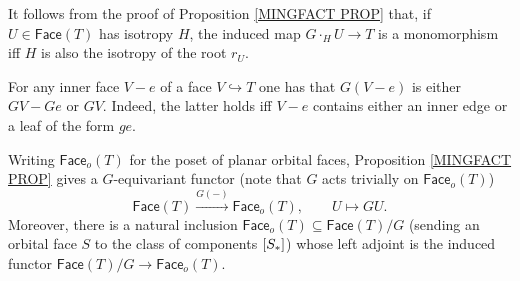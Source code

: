 \documentclass[a4paper,10pt
]{article}%
\begin{document}
\begin{remark}
	It follows from the proof of 
	Proposition \ref{MINGFACT PROP}
	that, if $U \in \mathsf{Face}(T)$ has isotropy $H$,
	the induced map 
	$G \cdot_H U \to T$ is a monomorphism iff
	$H$ is also the isotropy of the root $r_U$.
\end{remark}


\begin{remark}\label{GINNER REM}
	For any inner face $V-e$ 
	of a face $V \hookrightarrow T$ one has 
	that $G(V-e)$ is either $GV - Ge$ or $GV$.
	Indeed, the latter holds iff $V-e$ contains either an inner edge or a leaf of the form $ge$.
\end{remark}


\begin{remark}
Writing $\mathsf{Face}_o(T)$ for the poset of planar orbital faces, Proposition \ref{MINGFACT PROP} gives a $G$-equivariant functor (note that $G$ acts trivially on $\mathsf{Face}_o(T)$)
\[
	\mathsf{Face}(T) \xrightarrow{G(-)} \mathsf{Face}_o(T),
\qquad
	U \mapsto GU.
\]
Moreover, there is a natural inclusion
$\mathsf{Face}_o(T) \subseteq \mathsf{Face}(T)/G$ (sending an orbital face $S$ to the class of components $[S_{\**}]$)
whose left adjoint is the induced functor 
$\mathsf{Face}(T)/G \to \mathsf{Face}_o(T)$.
\end{remark}
\end{document}
